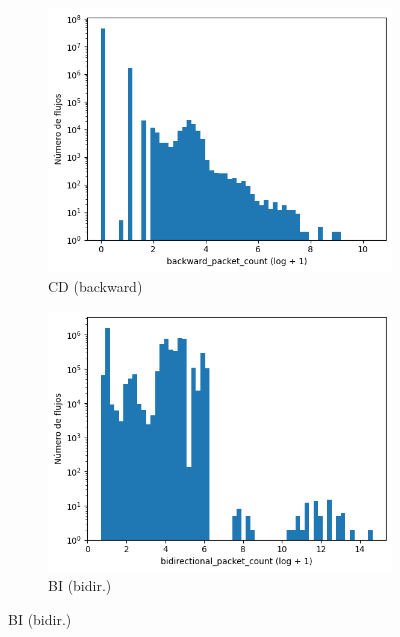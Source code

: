\begin{figure}[H]
\begin{subfigure}[b]{0.26\textwidth}
        \includegraphics[width=\textwidth]{media/packet_pincer_cicddos/backward_packet_count_log_x_log_y.png}
        \caption{CD (backward)}
    \end{subfigure}
    \hfill
    \begin{subfigure}[b]{0.26\textwidth}
        \centering
        \includegraphics[width=\linewidth]{media/packet_pincer_botiot/bidirectional_packet_count_log_x_log_y.png}
        \caption{BI (bidir.)}

\end{subfigure}
\end{figure}
